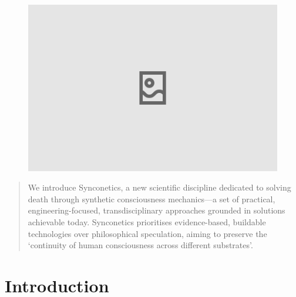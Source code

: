 \documentclass[10pt]{article}
\begin{document}
\begin{sloppypar}

  \begin{figure}[ht]
    \centering
    \includegraphics[width=\textwidth]{figures/cover.png}
    \label{fig:cover}
  \end{figure}
  \newpage


  \begin{abstract}
    We introduce Synconetics, a new scientific discipline dedicated to solving death through synthetic consciousness mechanics—a set of practical, engineering-focused, transdisciplinary approaches grounded in solutions achievable today. Synconetics prioritises evidence-based, buildable technologies over philosophical speculation, aiming to preserve the ‘continuity of human consciousness across different substrates’.
  \end{abstract}

  \pagebreak
  \tableofcontents
  \pagebreak


  \section{Introduction}
  \label{sec:introduction}


\end{sloppypar}
\end{document}

